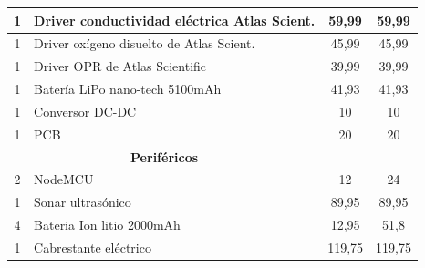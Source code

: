 \begin{appendices}
\begin{table}[t]
\begin{tabular}{clcc}
\multicolumn{1}{|c|}{1}                 & \multicolumn{1}{l|}{Driver conductividad eléctrica Atlas Scient.} & \multicolumn{1}{c|}{59,99}              & \multicolumn{1}{c|}{59,99}              \\ \hline
\multicolumn{1}{|c|}{1}                 & \multicolumn{1}{l|}{Driver oxígeno disuelto de Atlas Scient.}        & \multicolumn{1}{c|}{45,99}              & \multicolumn{1}{c|}{45,99}              \\ \hline
\multicolumn{1}{|c|}{1}                 & \multicolumn{1}{l|}{Driver OPR de Atlas Scientific}                     & \multicolumn{1}{c|}{39,99}              & \multicolumn{1}{c|}{39,99}              \\ \hline
\multicolumn{1}{|c|}{1}                 & \multicolumn{1}{l|}{Batería LiPo nano-tech 5100mAh}                     & \multicolumn{1}{c|}{41,93}              & \multicolumn{1}{c|}{41,93}              \\ \hline
\multicolumn{1}{|c|}{1}                 & \multicolumn{1}{l|}{Conversor DC-DC}                                    & \multicolumn{1}{c|}{10}                 & \multicolumn{1}{c|}{10}                 \\ \hline
\multicolumn{1}{|c|}{1}                 & \multicolumn{1}{l|}{PCB}                                                & \multicolumn{1}{c|}{20}                 & \multicolumn{1}{c|}{20}                 \\ \hline
\multicolumn{2}{|c|}{\textbf{Periféricos}}                                                                        & \multicolumn{2}{l|}{}                                                             \\ \hline
\multicolumn{1}{|c|}{2}                 & \multicolumn{1}{l|}{NodeMCU}                                            & \multicolumn{1}{c|}{12}                 & \multicolumn{1}{c|}{24}                 \\ \hline
\multicolumn{1}{|c|}{1}                 & \multicolumn{1}{l|}{Sonar ultrasónico}                                  & \multicolumn{1}{c|}{89,95}              & \multicolumn{1}{c|}{89,95}              \\ \hline
\multicolumn{1}{|c|}{4}                 & \multicolumn{1}{l|}{Bateria Ion litio 2000mAh}                          & \multicolumn{1}{c|}{12,95}              & \multicolumn{1}{c|}{51,8}               \\ \hline
\multicolumn{1}{|c|}{1}                 & \multicolumn{1}{l|}{Cabrestante eléctrico}                              & \multicolumn{1}{c|}{119,75}             & \multicolumn{1}{c|}{119,75}             \\ \hline

\end{tabular}
\end{table}
\end{appendices}
